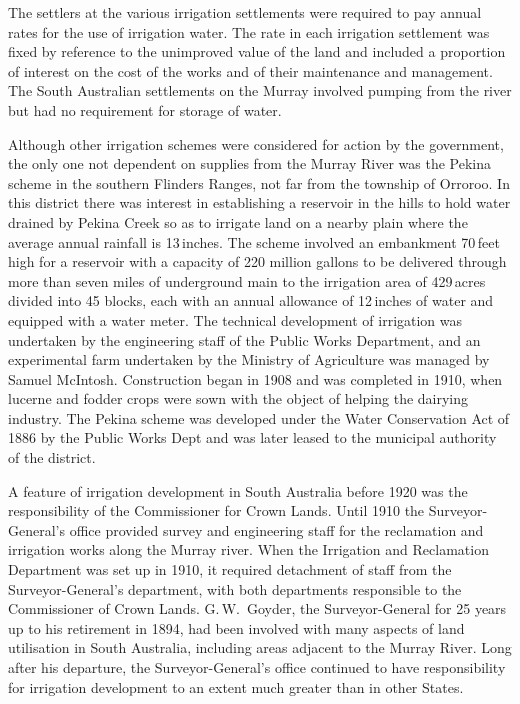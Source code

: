 The settlers at the various irrigation settlements were required to
pay annual rates for the use of irrigation water.  The rate in each
irrigation settlement was fixed by reference to the unimproved value
of the land and included a proportion of interest on the cost of the
works and of their maintenance and management.  The South Australian
settlements on the Murray involved pumping from the river but had no
requirement for storage of water.

Although other irrigation schemes were considered for action by the
government, the only one not dependent on supplies from the Murray
River was the Pekina scheme  in the
southern Flinders Ranges, not far from the township of
Orroroo.  In this district there was interest in
establishing a reservoir in the hills to hold water drained by Pekina
Creek  so as to irrigate land on a nearby plain
where the average annual rainfall is 13\,inches.  The scheme involved
an embankment 70\,feet high for a reservoir with a capacity of 220
million gallons to be delivered through more than seven miles of
underground main to the irrigation area of 429\,acres divided into 45
blocks, each with an annual allowance of 12\,inches of water and
equipped with a water meter.  The technical development of irrigation
was undertaken by the engineering staff of the Public Works
Department, and an experimental farm undertaken by the Ministry of
Agriculture was managed by Samuel McIntosh.  Construction began in
1908 and was completed in 1910, when lucerne and fodder crops were
sown with the object of helping the dairying industry.  The Pekina
scheme was developed under the Water Conservation Act of 1886 by the
Public Works Dept and was later leased to the municipal authority of
the district.

A feature of irrigation development in South Australia before 1920 was
the responsibility of the Commissioner for Crown Lands.  Until 1910
the Surveyor-General's office provided survey and engineering staff
for the reclamation and irrigation works along the Murray river.  When
the Irrigation and Reclamation Department was set up in 1910, it
required detachment of staff from the Surveyor-General's department,
with both departments responsible to the Commissioner of Crown Lands.
G.\,W.~Goyder, the Surveyor-General for 25 years up to his retirement
in 1894, had been involved with many aspects of land utilisation in
South Australia, including areas adjacent to the Murray River.  Long
after his departure, the Surveyor-General's office continued to have
responsibility for irrigation development to an extent much greater
than in other States.

